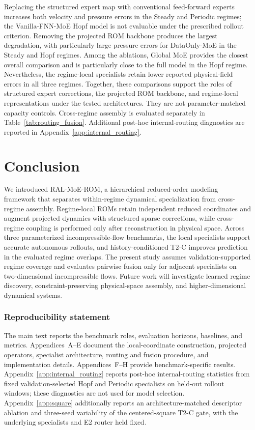 \documentclass{article}
\begin{document}
Replacing the structured expert map with conventional feed-forward experts increases both velocity and pressure errors in the Steady and Periodic regimes; the Vanilla-FNN-MoE Hopf model is not evaluable under the prescribed rollout criterion. Removing the projected ROM backbone produces the largest degradation, with particularly large pressure errors for DataOnly-MoE in the Steady and Hopf regimes. Among the ablations, Global MoE provides the closest overall comparison and is particularly close to the full model in the Hopf regime. Nevertheless, the regime-local specialists retain lower reported physical-field errors in all three regimes. Together, these comparisons support the roles of structured expert corrections, the projected ROM backbone, and regime-local representations under the tested architectures. They are not parameter-matched capacity controls. Cross-regime assembly is evaluated separately in Table~\ref{tab:routing_fusion}. Additional post-hoc internal-routing diagnostics are reported in
Appendix~\ref{app:internal_routing}.




\FloatBarrier
\section{Conclusion}

We introduced RAL-MoE-ROM, a hierarchical reduced-order modeling framework that separates within-regime dynamical specialization from cross-regime assembly. Regime-local ROMs retain independent reduced coordinates and augment projected dynamics with structured sparse corrections, while
cross-regime coupling is performed only after reconstruction in physical space. Across three parameterized incompressible-flow benchmarks, the local specialists support accurate autonomous rollouts, and history-conditioned T2-C improves prediction in the evaluated regime overlaps. The present study assumes validation-supported regime coverage and evaluates pairwise fusion only for adjacent specialists on two-dimensional incompressible flows. Future work will investigate learned regime discovery, constraint-preserving physical-space assembly, and higher-dimensional dynamical systems.


\subsubsection*{Reproducibility statement}
The main text reports the benchmark roles, evaluation horizons, baselines, and metrics. Appendices~A--E document the local-coordinate construction, projected operators, specialist architecture, routing and fusion procedure, and implementation details. Appendices~F--H provide benchmark-specific results.
Appendix~\ref{app:internal_routing} reports post-hoc internal-routing statistics
from fixed validation-selected Hopf and Periodic specialists on held-out
rollout windows; these diagnostics are not used for model selection.
Appendix~\ref{app:square} additionally reports an architecture-matched descriptor
ablation and three-seed variability of the centered-square T2-C gate, with the
underlying specialists and E2 router held fixed.
\end{document}
